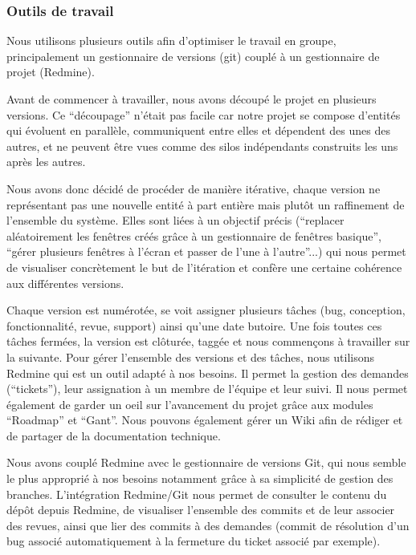 \subsubsection{Outils de travail}
\label{Outils de travail}
Nous utilisons plusieurs outils afin d'optimiser le travail en groupe, principalement un gestionnaire de versions (git) couplé à un gestionnaire de projet (Redmine).

Avant de commencer à travailler, nous avons découpé le projet en plusieurs versions. Ce ``découpage'' n'était pas facile car notre projet se compose d'entités qui évoluent en parallèle, communiquent entre elles et dépendent des unes des autres, et ne peuvent être vues comme des silos indépendants construits les uns après les autres.

Nous avons donc décidé de procéder de manière itérative, chaque version ne représentant pas une nouvelle entité à part entière mais plutôt un raffinement de l'ensemble du système. Elles sont liées à un objectif précis (``replacer aléatoirement les fenêtres créés grâce à un gestionnaire de fenêtres basique'', ``gérer plusieurs fenêtres à l'écran et passer de l'une à l'autre''...) qui nous permet de visualiser concrètement le but de l'itération et confère une certaine cohérence aux différentes versions. 

Chaque version est numérotée, se voit assigner plusieurs tâches (bug, conception, fonctionnalité, revue, support) ainsi qu'une date butoire. Une fois toutes ces tâches fermées, la version est clôturée, taggée et nous commençons à travailler sur la suivante. Pour gérer l'ensemble des versions et des tâches, nous utilisons Redmine qui est un outil adapté à nos besoins. Il permet la gestion des demandes (``tickets''), leur assignation à un membre de l'équipe et leur suivi. Il nous permet également de garder un oeil sur l'avancement du projet grâce aux modules ``Roadmap'' et ``Gant''. Nous pouvons également gérer un Wiki afin de rédiger et de partager de la documentation technique.

Nous avons couplé Redmine avec le gestionnaire de versions Git, qui nous semble le plus approprié à nos besoins notamment grâce à sa simplicité de gestion des branches. L'intégration Redmine/Git nous permet de consulter le contenu du dépôt depuis Redmine, de visualiser l'ensemble des commits et de leur associer des revues, ainsi que lier des commits à des demandes (commit de résolution d'un bug associé automatiquement à la fermeture du ticket associé par exemple).

